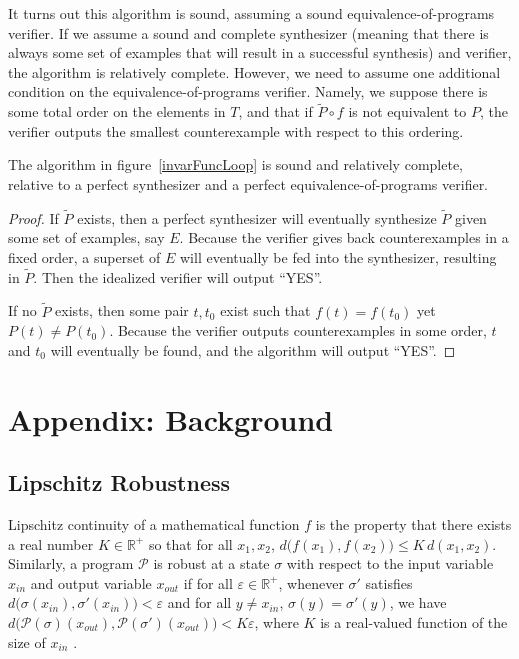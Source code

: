 \documentclass{llncs}
\begin{document}
  It turns out this algorithm is sound, assuming a sound equivalence-of-programs
  verifier.
  If we assume a sound and complete synthesizer (meaning that there is
  always some set of examples that will result in a successful synthesis)
  and verifier, the algorithm is relatively complete.
  However, we need to assume one additional condition on the
  equivalence-of-programs verifier.
  Namely, we suppose there is some total order on the elements in $T$,
  and that if $\widetilde{P}\circ f$ is not equivalent to $P$,
  the verifier outputs the smallest counterexample with respect to this
  ordering.

  \begin{theorem}
    The algorithm in figure~\ref{invarFuncLoop} is sound and relatively complete,
    relative to a perfect synthesizer and a perfect equivalence-of-programs
    verifier.
  \end{theorem}
  \begin{proof}

    If $\widetilde{P}$ exists, then a perfect synthesizer will eventually
    synthesize $\widetilde{P}$ given some set of examples, say $E$.
    Because the verifier gives back counterexamples in a fixed order,
    a superset of $E$ will eventually be fed into the synthesizer,
    resulting in $\widetilde{P}$.
    Then the idealized verifier will output ``YES''.

    If no $\widetilde{P}$ exists, then some pair $t, t_0$ exist
    such that $f(t)=f(t_0)$ yet $P(t)\ne P(t_0)$.
    Because the verifier outputs counterexamples in some order,
    $t$ and $t_0$ will eventually be found, and the algorithm will output ``YES''.
  \end{proof}

\appendix

\section{Appendix: Background}

  \subsection{Lipschitz Robustness}

    Lipschitz continuity of a mathematical function \(f\) is the property that there
    exists a real number \(K \in \mathbb{R}^{+}\) so that for all \(x_{1}, x_{2}\),
    \(d\big(f(x_{1}), f(x_{2})\big) \leq K\,d(x_{1}, x_{2})\).  Similarly, a program
    \(\mathcal{P}\) is robust at a state \(\sigma\)  with respect to the input
    variable \(x_{in}\) and output variable \(x_{out}\) if for all \(\varepsilon \in
    \mathbb{R}^{+}\), whenever \(\sigma'\) satisfies
    \(d\big(\sigma(x_{in}), \sigma'(x_{in})\big) < \varepsilon\) and
    for all \(y \not= x_{in}\), \(\sigma(y) = \sigma'(y)\),
    we have \(d\big(\mathcal{P}(\sigma)(x_{out}), \mathcal{P}(\sigma')(x_{out})\big) < K\varepsilon\),
    where \(K\) is a real-valued function of the size of \(x_{in}\)
    \cite{chaudhuri11}.
\end{document}
